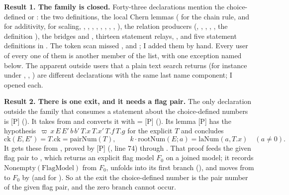 \documentclass[11pt]{article}
\newcommand{\mP}{\textsf{[P]}}
\theoremstyle{remark}
\begin{document}
\textbf{Result 1. The family is closed.} Forty-three declarations mention the choice-defined  or : the two definitions, the local Chern lemmas ( for the chain rule,  and  for additivity,  for scaling, , , , , , , , , ), the relation producers (, , , , , the definition ), the bridges  and , thirteen  statement relays, , and five statement definitions in . The token scan missed ,  and ; I added them by hand. Every user of every one of them is another member of the list, with one exception named below. The apparent outside users that a plain text search returns (for instance under , , ) are different declarations with the same last name component; I opened each.

\textbf{Result 2. There is one exit, and it needs a flag pair.} The only declaration outside the family that consumes a statement about the choice-defined numbers is \mP{}  (). It takes  from  and converts it with  = \mP{}  (). Its lemma \mP{}  has the hypothesis $\,\varpi\,x\,E\,E'\,b\,b'\,T.x\,T.x'\,T.f\,T.g$ for the explicit  $T$ and concludes
\[
\mathrm{ck}(E,E')=T.\mathrm{ck}=\mathrm{pairNum}(T),\qquad k\cdot\mathrm{rootNum}(E;a)=\mathrm{laNum}(a,T.x)\quad(a\neq0).
\]
It gets these from , proved by \mP{}  (, line 74) through . That proof feeds the given flag pair to , which returns an explicit flag model $F_0$ on a joined model; it records $\mathrm{Nonempty}(\mathrm{FlagModel})$ from $F_0$, unfolds  into its first branch (), and moves from  to $F_0$ by  (and  for ). So at the exit the choice-defined number is the pair number of the given flag pair, and the zero branch cannot occur.
\end{document}
